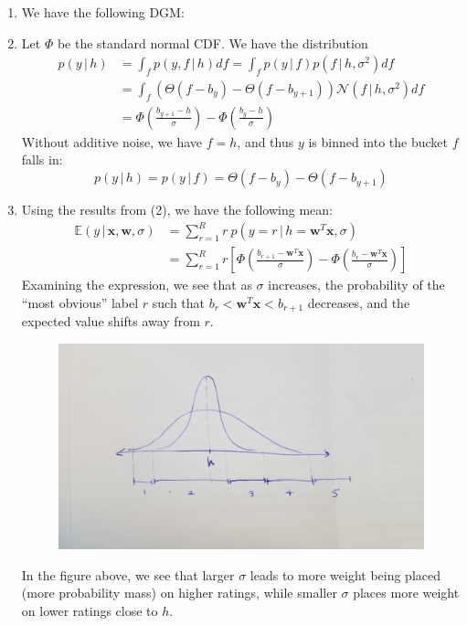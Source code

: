 \documentclass[submit]{harvardml}
\newcommand{\given}{\,|\,}
\theoremstyle{plain}
\begin{document}
\begin{enumerate}
	\item We have the following DGM:
	\begin{center}
	\end{center}

	\item Let $\Phi$ be the standard normal CDF. We have the distribution
	\begin{align*}
	p(y\given h) &= \int_{f} p(y, f\given h) df
	= \int_{f} p(y\given f) p(f\given h, \sigma^2) df \\
	&= \int_{f} \left(\Theta(f - b_y) - \Theta(f-b_{y+1})\right) \mathcal{N}(f\given h,\sigma^2) df \\
	&= \Phi\left(\frac{b_{y+1} - h}{\sigma}\right) - \Phi\left(\frac{b_{y} - h}{\sigma}\right)
	\end{align*}
	Without additive noise, we have $f = h$, and thus $y$ is binned into the bucket $f$ falls in:
	\[
	p(y\given h) = p(y\given f) = \Theta(f - b_y) - \Theta(f-b_{y+1})
	\]
	
	\item Using the results from (2), we have the following mean:
	\begin{align*}
	\mathbb{E}(y\given\bm{x},\bm{w},\sigma) 
	&= \sum_{r = 1}^R r \ p(y=r\given h = \bm{w}^T\bm{x},\sigma) \\
	&= \sum_{r = 1}^R r \left[\Phi\left(\frac{b_{r+1} - \bm{w}^T\bm{x}}{\sigma}\right) - \Phi\left(\frac{b_{r} - \bm{w}^T\bm{x}}{\sigma}\right)\right]
	\end{align*}
	Examining the expression, we see that as $\sigma$ increases, the probability of the ``most obvious'' label $r$ such that $b_r < \bm{w}^T\bm{x} < b_{r+1}$ decreases, and the expected value shifts away from $r$.	
	\begin{figure}
		\centering
		\includegraphics[width=.75\textwidth]{3}
		\label{2}
	\end{figure}
	In the figure above, we see that larger $\sigma$ leads to more weight being placed (more probability mass) on higher ratings, while smaller $\sigma$ places more weight on lower ratings close to $h$.
	

\end{enumerate}
\end{document}
